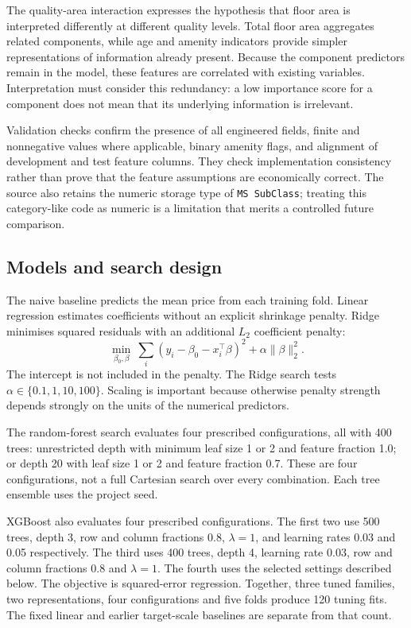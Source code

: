 \documentclass{sigkddExp}
\begin{document}
The quality-area interaction expresses the hypothesis that floor area is interpreted differently at different quality levels. Total floor area aggregates related components, while age and amenity indicators provide simpler representations of information already present. Because the component predictors remain in the model, these features are correlated with existing variables. Interpretation must consider this redundancy: a low importance score for a component does not mean that its underlying information is irrelevant.

Validation checks confirm the presence of all engineered fields, finite and nonnegative values where applicable, binary amenity flags, and alignment of development and test feature columns. They check implementation consistency rather than prove that the feature assumptions are economically correct. The source also retains the numeric storage type of \texttt{MS SubClass}; treating this category-like code as numeric is a limitation that merits a controlled future comparison.

\subsection{Models and search design}
The naive baseline predicts the mean price from each training fold. Linear regression estimates coefficients without an explicit shrinkage penalty. Ridge minimises squared residuals with an additional $L_2$ coefficient penalty:
\begin{equation}
\min_{\beta_0,\beta}\ \sum_i(y_i-\beta_0-x_i^\top\beta)^2
    +\alpha\|\beta\|_2^2 .
\end{equation}
The intercept is not included in the penalty. The Ridge search tests $\alpha\in\{0.1,1,10,100\}$. Scaling is important because otherwise penalty strength depends strongly on the units of the numerical predictors.

The random-forest search evaluates four prescribed configurations, all with 400 trees: unrestricted depth with minimum leaf size 1 or 2 and feature fraction 1.0; or depth 20 with leaf size 1 or 2 and feature fraction 0.7. These are four configurations, not a full Cartesian search over every combination. Each tree ensemble uses the project seed.

XGBoost also evaluates four prescribed configurations. The first two use 500 trees, depth 3, row and column fractions 0.8, $\lambda=1$, and learning rates 0.03 and 0.05 respectively. The third uses 400 trees, depth 4, learning rate 0.03, row and column fractions 0.8 and $\lambda=1$. The fourth uses the selected settings described below. The objective is squared-error regression. Together, three tuned families, two representations, four configurations and five folds produce 120 tuning fits. The fixed linear and earlier target-scale baselines are separate from that count.
\end{document}
